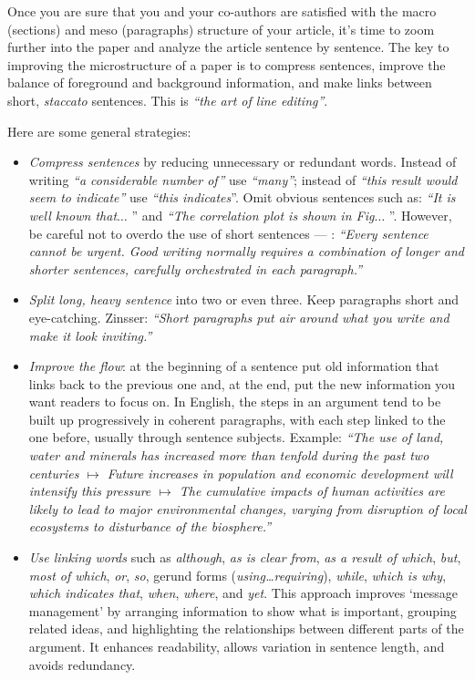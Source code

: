 \documentclass[graybox,envcountchap,sectrefs,UStrade]{svmono}
\begin{document}
Once you are sure that you and your co-authors are satisfied with the macro (sections) and meso (paragraphs) structure of your article, it's time to zoom further into the paper and analyze the article sentence by sentence. The key to improving the microstructure of a paper is to compress sentences, improve the balance of foreground and background information, and make links between short, \emph{staccato} sentences. This is \emph{``the art of line editing''}.\par

Here are some general strategies:

\begin{itemize}
    \item \emph{Compress sentences} by reducing unnecessary or redundant words. Instead of writing \emph{``a considerable number of''} use \emph{``many''}; instead of \emph{``this result would seem to indicate''} use \emph{``this indicates}''. Omit obvious sentences such as: \emph{``It is well known that$\ldots$ }'' and  \emph{``The correlation plot is shown in Fig$\ldots$ }''. However, be careful not to overdo the use of short sentences --- \citet{Jasper2002CC}: \emph{``Every sentence cannot be urgent. Good writing normally requires a combination of longer and shorter sentences, carefully orchestrated in each paragraph.''}
    \item \emph{Split long, heavy sentence} into two or even three. Keep paragraphs short and eye-catching. Zinsser: \emph{``Short paragraphs put air around what you write and make it look inviting.''}
    \item \emph{Improve the flow}: at the beginning of a sentence put old information that links back to the previous one and, at the end, put the new information you want readers to focus on. In English, the steps in an argument tend to be built up progressively in coherent paragraphs, with each step linked to the one before, usually through sentence subjects. Example: \emph{``The use of land, water and minerals has increased more than tenfold during the past two centuries $\mapsto$ Future increases in population and economic development will intensify this pressure $\mapsto$ The cumulative impacts of human activities are likely to lead to major environmental changes, varying from disruption of local ecosystems to disturbance of the biosphere.''}
    \item \emph{Use linking words} such as \emph{although}, \emph{as is clear from}, \emph{as a result of which}, \emph{but}, \emph{most of which}, \emph{or}, \emph{so}, gerund forms (\emph{using\ldots  requiring}), \emph{while}, \emph{which is why}, \emph{which indicates that}, \emph{when}, \emph{where}, and \emph{yet}. This approach improves `message management' by arranging information to show what is important, grouping related ideas, and highlighting the relationships between different parts of the argument. It enhances readability, allows variation in sentence length, and avoids redundancy.

\end{itemize}
\end{document}
